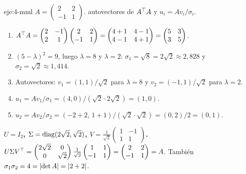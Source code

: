 \begin{solucion}{eje:4-mml}
\datos $A=\begin{pmatrix}2&2\\-1&1\end{pmatrix}$.
\planteamiento autovectores de $A^{\top} A$ y $u_i=Av_i/\sigma_i$.
\pasos
\begin{enumerate}[label=\arabic*.]
  \item $A^{\top} A=\begin{pmatrix}2&-1\\2&1\end{pmatrix}\begin{pmatrix}2&2\\-1&1\end{pmatrix}=\begin{pmatrix}4+1&4-1\\4-1&4+1\end{pmatrix}=\begin{pmatrix}5&3\\3&5\end{pmatrix}$.
  \item $(5-\lambda)^{2}=9$, luego $\lambda=8$ y $\lambda=2$: $\sigma_1=\sqrt{8}=2\sqrt{2}\approx 2{,}828$ y $\sigma_2=\sqrt{2}\approx 1{,}414$.
  \item Autovectores: $v_1=(1,1)/\sqrt{2}$ para $\lambda=8$ y $v_2=(-1,1)/\sqrt{2}$ para $\lambda=2$.
  \item $u_1=Av_1/\sigma_1=(4,0)/(\sqrt{2}\cdot 2\sqrt{2})=(1,0)$.
  \item $u_2=Av_2/\sigma_2=(-2+2,\,1+1)/(\sqrt{2}\cdot\sqrt{2})=(0,2)/2=(0,1)$.
\end{enumerate}
\resultado \textbf{$U=I_2$, $\Sigma=\operatorname{diag}(2\sqrt{2},\sqrt{2})$, $V=\frac{1}{\sqrt{2}}\begin{pmatrix}1&-1\\1&1\end{pmatrix}$.}
\comprobacion $U\Sigma V^{\top}=\begin{pmatrix}2\sqrt{2}&0\\0&\sqrt{2}\end{pmatrix}\frac{1}{\sqrt{2}}\begin{pmatrix}1&1\\-1&1\end{pmatrix}=\begin{pmatrix}2&2\\-1&1\end{pmatrix}=A$. También $\sigma_1\sigma_2=4=\lvert\det A\rvert=\lvert2+2\rvert$.
\end{solucion}

